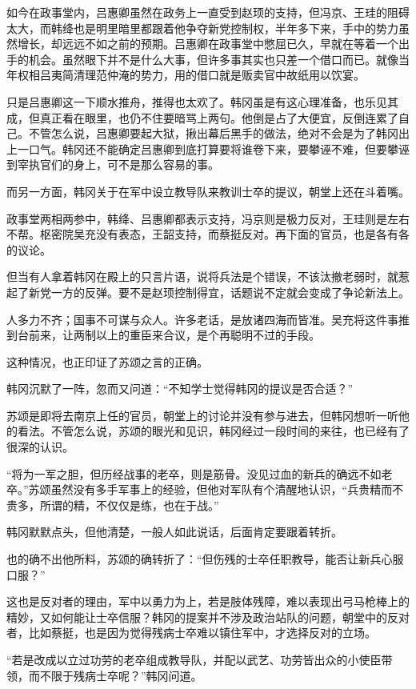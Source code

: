 如今在政事堂内，吕惠卿虽然在政务上一直受到赵顼的支持，但冯京、王珪的阻碍太大，而韩绛也是明里暗里都跟着他争夺新党控制权，半年多下来，手中的势力虽然增长，却远远不如之前的预期。吕惠卿在政事堂中憋屈已久，早就在等着一个出手的机会。虽然眼下并不是什么大事，但许多事其实也只差一个借口而已。就像当年权相吕夷简清理范仲淹的势力，用的借口就是贩卖官中故纸用以饮宴。

只是吕惠卿这一下顺水推舟，推得也太欢了。韩冈虽是有这心理准备，也乐见其成，但真正看在眼里，也仍不住要暗骂上两句。他倒是占了大便宜，反倒连累了自己。不管怎么说，吕惠卿要起大狱，揪出幕后黑手的做法，绝对不会是为了韩冈出上一口气。韩冈还不能确定吕惠卿到底打算要将谁卷下来，要攀诬不难，但要攀诬到宰执官们的身上，可不是那么容易的事。

而另一方面，韩冈关于在军中设立教导队来教训士卒的提议，朝堂上还在斗着嘴。

政事堂两相两参中，韩绛、吕惠卿都表示支持，冯京则是极力反对，王珪则是左右不帮。枢密院吴充没有表态，王韶支持，而蔡挺反对。再下面的官员，也是各有各的议论。

但当有人拿着韩冈在殿上的只言片语，说将兵法是个错误，不该汰撤老弱时，就惹起了新党一方的反弹。要不是赵顼控制得宜，话题说不定就会变成了争论新法上。

人多力不齐；国事不可谋与众人。许多老话，是放诸四海而皆准。吴充将这件事推到台前来，让两制以上的重臣来合议，是个再聪明不过的手段。

这种情况，也正印证了苏颂之言的正确。

韩冈沉默了一阵，忽而又问道：“不知学士觉得韩冈的提议是否合适？”

苏颂是即将去南京上任的官员，朝堂上的讨论并没有参与进去，但韩冈想听一听他的看法。不管怎么说，苏颂的眼光和见识，韩冈经过一段时间的来往，也已经有了很深的认识。

“将为一军之胆，但历经战事的老卒，则是筋骨。没见过血的新兵的确远不如老卒。”苏颂虽然没有多手军事上的经验，但他对军队有个清醒地认识，“兵贵精而不贵多，所谓的精，不仅仅是练，也在于战。”

韩冈默默点头，但他清楚，一般人如此说话，后面肯定要跟着转折。

也的确不出他所料，苏颂的确转折了：“但伤残的士卒任职教导，能否让新兵心服口服？”

这也是反对者的理由，军中以勇力为上，若是肢体残障，难以表现出弓马枪棒上的精妙，又如何能让士卒信服？韩冈的提案并不涉及政治站队的问题，朝堂中的反对者，比如蔡挺，也是因为觉得残病士卒难以镇住军中，才选择反对的立场。

“若是改成以立过功劳的老卒组成教导队，并配以武艺、功劳皆出众的小使臣带领，而不限于残病士卒呢？”韩冈问道。

